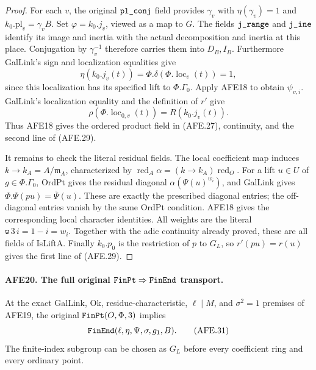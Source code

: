 \documentclass[11pt,a4paper]{article}
\numberwithin{equation}{section}
\theoremstyle{remark}\newtheorem{remark}[theorem]{Remark}
\begin{document}
\begin{proof}
For each \(v\), the original
\(\texttt{pl\_\allowbreak conj}\) field provides \(\gamma_v\)
with \(\eta(\gamma_v)=1\) and
\(k_0.\mathrm{pl}_v=\gamma_v B\).
Set \(\varphi=k_0.j_v\), viewed as a map to \(G\).
The fields \(\texttt{j\_\allowbreak range}\) and \(\texttt{j\_\allowbreak ine}\)
identify its image and inertia with the actual
decomposition and inertia at this place.
Conjugation by \(\gamma_v^{-1}\) therefore carries
them into \(D_B,I_B\).
Furthermore GalLink's sign and localization equalities
give
\[
           \eta(k_0.j_v(t))
             =\Phi.\delta(\Phi.\operatorname{loc}_v(t))=1,
 \]
since this localization has its specified lift to
\(\Phi.\Gamma_0\).
Apply AFE18 to obtain \(\psi_{v,i}\).
GalLink's localization equality and the definition of
\(r'\) give
\[
          \rho(\Phi.\operatorname{loc}_{0,v}(t))
                           =R(k_0.j_v(t)).
 \]
Thus AFE18 gives the ordered product field in
(AFE.27), continuity, and the second line of (AFE.29).

It remains to check the literal residual fields.
The local coefficient map induces
\(k\to k_A=A/\mathfrak m_A\), characterized by
\(\operatorname{red}_A\alpha=
 (k\to k_A)\operatorname{red}_O\).
For a lift \(u\in U\) of \(g\in\Phi.\Gamma_0\),
OrdPt gives the residual diagonal
\(\alpha(\Psi(u)^{w_i})\), and GalLink gives
\(\Phi.\Psi(pu)=\overline\Psi(u)\).
These are exactly the prescribed diagonal entries;
the off-diagonal entries vanish by the same OrdPt
condition.  AFE18 gives the corresponding local
character identities.  All weights are the literal
\(\texttt{w}\,3\,i=1-i=w_i\).
Together with the adic continuity already proved,
these are all fields of IsLiftA.
Finally \(k_0.p_0\) is the restriction of \(p\)
to \(G_L\), so \(r'(pu)=r(u)\) gives the first
line of (AFE.29).
\end{proof}

\paragraph{AFE20. The full original \(\texttt{Fin\allowbreak Pt}\Rightarrow\texttt{Fin\allowbreak End}\) transport.}
\label{claim:AFE20}
At the exact GalLink, Ok, residue-characteristic,
\(\ell\mid M\), and \(\sigma^2=1\) premises of
AFE19, the original \(\texttt{Fin\allowbreak Pt}(O,\Phi,3)\)
implies
\[
                    \texttt{Fin\allowbreak End}(\ell,\eta,\Psi,\sigma,g_1,B).
                                                        \tag{AFE.31}
\]
The finite-index subgroup can be chosen as
\(G_L\) before every coefficient ring and every
ordinary point.
\end{document}
